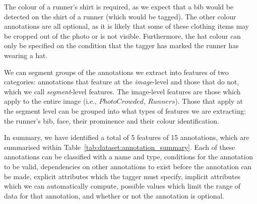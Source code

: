 
The colour of a runner's shirt is required, as we expect that a bib would be detected on the shirt of a runner (which would be tagged). The other colour annotations are all optional, as it is likely that some of these clothing items may be cropped out of the photo or is not visible. Furthermore, the hat colour can only be specified on the condition that the tagger has marked the runner has wearing a hat.

We can segment groups of the annotations we extract into features of two categories: annotations that feature at the \textit{image}-level and those that do not, which we call \textit{segment}-level features. The image-level features are those which apply to the entire image (i.e., $PhotoCrowded$, $Runners$). Those that apply at the segment level can be grouped into what types of features we are extracting: the runner's bib, face, their prominence and their colour identification.

In summary, we have identified a total of 5 features of 15 annotations, which are summarised within Table~\ref{tab:dataset:annotation_summary}. Each of these annotations can be classified with a name and type, conditions for the annotation to be valid, dependencies on other annotations to exist before the annotation can be made, explicit attributes which the tagger must specify, implicit attributes which we can automatically compute, possible values which limit the range of data for that annotation, and whether or not the annotation is optional.

